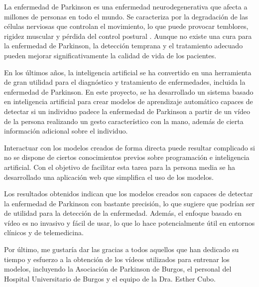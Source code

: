 \label{cha:Introducción}

La enfermedad de Parkinson es una enfermedad neurodegenerativa que afecta a
millones de personas en todo el mundo. Se caracteriza por la degradación de las
células nerviosas que controlan el movimiento, lo que puede provocar temblores,
rigidez muscular y pérdida del control postural \cite{eswiki:148845196}. Aunque
no existe una cura para la enfermedad de Parkinson, la detección temprana y el
tratamiento adecuado pueden mejorar significativamente la calidad de vida de los
pacientes.

En los últimos años, la inteligencia artificial se ha convertido en una
herramienta de gran utilidad para el diagnóstico y tratamiento de enfermedades,
incluida la enfermedad de Parkinson. En este proyecto, se ha desarrollado un
sistema basado en inteligencia artificial para crear modelos de aprendizaje
automático capaces de detectar si un individuo padece la enfermedad de Parkinson
a partir de un vídeo de la persona realizando un gesto característico con la
mano, además de cierta información adicional sobre el individuo.

Interactuar con los modelos creados de forma directa puede resultar complicado
si no se dispone de ciertos conocimientos previos sobre programación e
inteligencia artificial. Con el objetivo de facilitar esta tarea para la persona
media se ha desarrollado una aplicación web que simplifica el uso de los
modelos.

Los resultados obtenidos indican que los modelos creados son capaces de detectar
la enfermedad de Parkinson con bastante precisión, lo que sugiere que podrían
ser de utilidad para la detección de la enfermedad. Además, el enfoque basado en
vídeo es no invasivo y fácil de usar, lo que lo hace potencialmente útil en
entornos clínicos y de telemedicina.

Por último, me gustaría dar las gracias a todos aquellos que han dedicado su
tiempo y esfuerzo a la obtención de los vídeos utilizados para entrenar los
modelos, incluyendo la Asociación de Parkinson de Burgos, el personal del
Hospital Universitario de Burgos y el equipo de la Dra. Esther Cubo.
